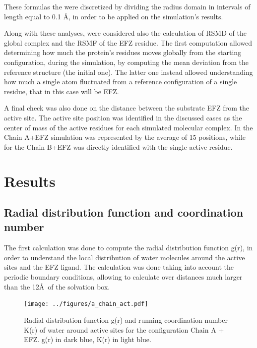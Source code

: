 \documentclass[12pt]{article}
\begin{document}
These formulas the were discretized by dividing the radius domain in intervals of length equal to 0.1 \AA, in order to be applied on the simulation's results.

Along with these analyses, were considered also the calculation of RSMD of the global complex and the RSMF of the EFZ residue. The first computation allowed determining how much the protein's residues moves globally from the starting configuration, during the simulation, by computing the mean deviation from the reference structure (the initial one). The latter one instead allowed understanding how much a single atom fluctuated from a reference configuration of a single residue, that in this case will be EFZ.

A final check was also done on the distance between the substrate EFZ from the active site. The active site position was identified in the discussed cases as the center of mass of the active residues for each simulated molecular complex. In the Chain A+EFZ simulation was represented by the average of 15 positions, while for the Chain B+EFZ was directly identified with the single active residue.
\section{Results}

\subsection{Radial distribution function and coordination number}
The first calculation was done to compute the radial distribution function g(r), in order to understand the local distribution of water molecules around the active sites and the EFZ ligand. The calculation was done taking into account the periodic boundary conditions, allowing to calculate over distances much larger than the 12\AA \, of the solvation box.

\begin{figure}
    \centering
    \texttt{[image: ../figures/a\_chain\_act.pdf]}
    \caption{Radial distribution function g(r) and running coordination number K(r) of water around active sites for the configuration Chain A + EFZ. g(r) in dark blue, K(r) in light blue.\label{fig:gofr_chain_a_efz_1}}
\end{figure}
\end{document}

